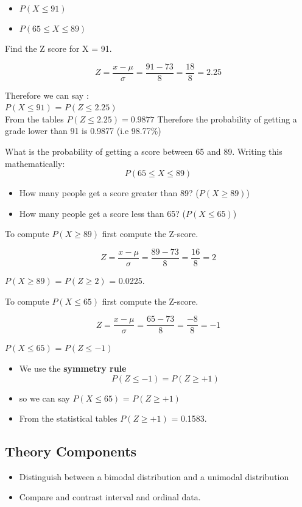 \documentclass[12pts]{article}
\begin{document}
\begin{itemize}
\item $P(X \leq 91)$
\item $P(65 \leq X \leq 89)$
\end{itemize}
Find the Z score for X = 91.

\[ Z = \frac{x- \mu}{ \sigma} = \frac{91 - 73}{8} =\frac{18}{8} = 2.25\]

Therefore we can say :\\ $P(X \leq 91)$ = $P(Z \leq 2.25)$ \\


From the tables $P(Z \leq 2.25) = 0.9877$
Therefore the probability of getting a grade lower than 91 is 0.9877 (i.e 98.77\%)


What is the probability of getting a score between 65 and 89.
Writing this mathematically:
\[ P(65 \leq X \leq 89) \]

\begin{itemize}
\item How many people get a score greater than 89? ($P(X\geq 89)$)
\item How many people get a score less than 65? ($P(X\leq 65)$)
\end{itemize}

To compute $P(X \geq 89)$ first compute the Z-score.

\[ Z = \frac{x - \mu}{\sigma} = \frac{89 - 73}{8} =\frac{16}{8} = 2 \]

$P(X \geq 89)$ = $P(Z \geq 2)$ = 0.0225.

To compute $P(X \leq 65)$ first compute the Z-score.

\[ Z = \frac{x - \mu}{\sigma} = \frac{65 - 73}{8} =\frac{-8}{8} = -1 \]

$P(X \leq 65)$ = $P(Z \leq -1)$ 

\begin{itemize}
\item We use the \textbf{symmetry rule}
\[ P(Z \leq -1) = P(Z \geq +1) \]
\item so we can say $P(X \leq 65)$ = $P(Z \geq +1)$ 
\item From the statistical tables $P(Z \geq +1)$ = 0.1583.
\end{itemize}

\subsection*{Theory Components}
\begin{itemize}
\item Distinguish between a bimodal distribution and a unimodal distribution
\item Compare and contrast interval and ordinal data.
\end{itemize}
\end{document}
